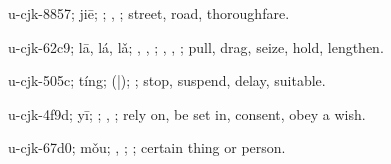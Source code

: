\begin{multicols}{2}
{\cjkgGlue{}u-cjk-8857; jiē; \cjkgGlue{}; \cjkgGlue{}, \cjkgGlue{}; street, road, thoroughfare.

\cjkgGlue{}u-cjk-62c9; lā, lá, lǎ; \cjkgGlue{}\cjkgGlue{}\cjkgGlue{}, \cjkgGlue{}\cjkgGlue{}\cjkgGlue{}, \cjkgGlue{}\cjkgGlue{}\cjkgGlue{}; \cjkgGlue{}, \cjkgGlue{}, \cjkgGlue{}; pull, drag, seize, hold, lengthen.

\cjkgGlue{}u-cjk-505c; tíng; \cjkgGlue{}\cjkgGlue{}(\cjkgGlue{}|\cjkgGlue{}); \cjkgGlue{}; stop, suspend, delay, suitable.

\cjkgGlue{}u-cjk-4f9d; yī; \cjkgGlue{}\cjkgGlue{}\cjkgGlue{}; \cjkgGlue{}, \cjkgGlue{}; rely on, be set in, consent, obey a wish.

\cjkgGlue{}u-cjk-67d0; mǒu; \cjkgGlue{}, \cjkgGlue{}; \cjkgGlue{}; certain thing or person.

}
\end{multicols}
